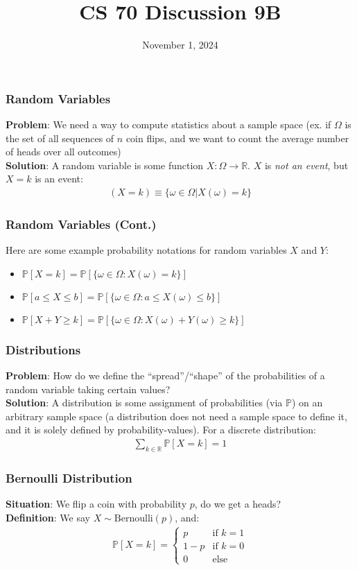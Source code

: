\documentclass{beamer}
\title{CS 70 Discussion 9B}
\date{November 1, 2024}
\begin{document}
\frame{\titlepage}

\begin{frame}
    \frametitle{Random Variables}
    {\bf Problem}: We need a way to compute statistics about a sample space (ex. if $\Omega$ is the set of all sequences of $n$ coin flips, and we want to count the average number of heads over all outcomes)\\
    {\bf Solution}: A random variable is some function $X:\Omega\rightarrow\mathbb{R}$. $X$ is {\it not an event}, but $X=k$ is an event:
    \begin{gather*}
        (X=k)\equiv\{\omega\in\Omega|X(\omega)=k\}
    \end{gather*}
\end{frame}

\begin{frame}
    \frametitle{Random Variables (Cont.)}
    Here are some example probability notations for random variables $X$ and $Y$:
    \begin{itemize}
        \item $\mathbb{P}[X=k]=\mathbb{P}[\{\omega\in\Omega:X(\omega)=k\}]$
        \item $\mathbb{P}[a\leq X\leq b]=\mathbb{P}[\{\omega\in\Omega:a\leq X(\omega)\leq b\}]$
        \item $\mathbb{P}[X+Y\geq k]=\mathbb{P}[\{\omega\in\Omega:X(\omega)+Y(\omega)\geq k\}]$
    \end{itemize}
\end{frame}

\begin{frame}
    \frametitle{Distributions}
    {\bf Problem}: How do we define the ``spread''/``shape'' of the probabilities of a random variable taking certain values?\\
    {\bf Solution}: A distribution is some assignment of probabilities (via $\mathbb{P}$) on an arbitrary sample space (a distribution does not need a sample space to define it, and it is solely defined by probability-values). For a discrete distribution:
    \begin{gather*}
        \sum_{k\in\mathbb{R}}\mathbb{P}[X=k]=1
    \end{gather*}
\end{frame}

\begin{frame}
    \frametitle{Bernoulli Distribution}
    {\bf Situation}: We flip a coin with probability $p$, do we get a heads?\\
    {\bf Definition}: We say $X\sim\text{Bernoulli}(p)$, and:
    \begin{gather*}
        \mathbb{P}[X=k]=\begin{cases}
            p&\text{if }k=1\\
            1-p&\text{if }k=0\\
            0&\text{else}
        \end{cases}
    \end{gather*}
\end{frame}
\end{document}
